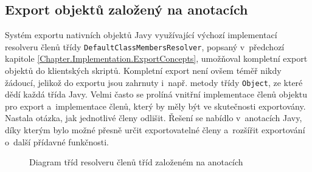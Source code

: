 \subsection{Export objektů založený na anotacích}
\label{Chapter.Implementation.AnnotationExportConcepts}

Systém exportu nativních objektů Javy využívající výchozí implementací resolveru členů třídy \texttt{DefaultClassMembersResolver}, popsaný v~předchozí kapitole \ref{Chapter.Implementation.ExportConcepts}, umožňoval kompletní export objektů do klientských skriptů. Kompletní export není ovšem téměř nikdy žádoucí, jelikož do exportu jsou zahrnuty i~např. metody třídy \texttt{Object}, ze které dědí každá třída Javy. Velmi často se prolíná vnitřní implementace členů objektu pro export a~implementace členů, který by měly být ve skutečnosti exportovány. Nastala otázka, jak jednotlivé členy odlišit. Řešení se nabídlo v~anotacích Javy, díky kterým bylo možné přesně určit exportovatelné členy a~rozšířit exportování o~další přídavné funkčnosti.

\begin{figure}[H]
  \begin{center}
    \caption{Diagram tříd resolveru členů tříd založeném na anotacích}
    \label{Figure.AnnotationClassMembersResolver}
  \end{center}
\end{figure}

